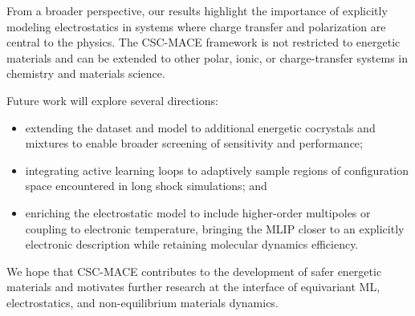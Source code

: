 \documentclass{article}
\begin{document}
From a broader perspective, our results highlight the importance of explicitly modeling electrostatics in systems where charge transfer and polarization are central to the physics. The CSC-MACE framework is not restricted to energetic materials and can be extended to other polar, ionic, or charge-transfer systems in chemistry and materials science.

Future work will explore several directions:
\begin{itemize}
    \item extending the dataset and model to additional energetic cocrystals and mixtures to enable broader screening of sensitivity and performance;
    \item integrating active learning loops to adaptively sample regions of configuration space encountered in long shock simulations; and
    \item enriching the electrostatic model to include higher-order multipoles or coupling to electronic temperature, bringing the MLIP closer to an explicitly electronic description while retaining molecular dynamics efficiency.
\end{itemize}
We hope that CSC-MACE contributes to the development of safer energetic materials and motivates further research at the interface of equivariant ML, electrostatics, and non-equilibrium materials dynamics.

\nocite{*}


\end{document}
